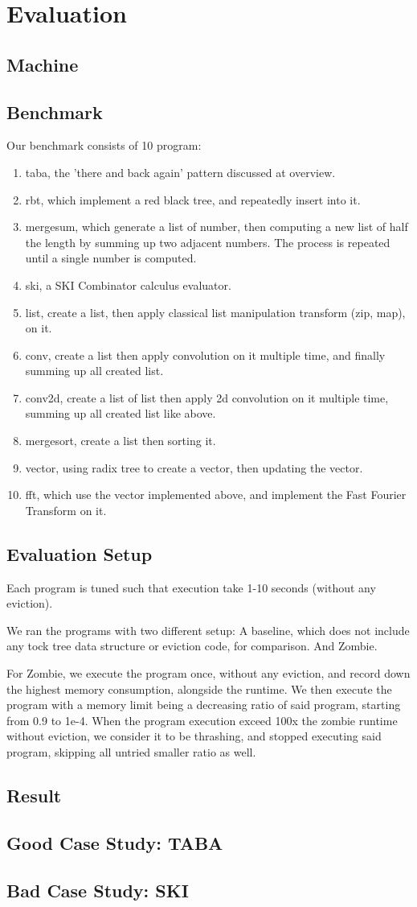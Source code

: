 \section{Evaluation}
\subsection{Machine}
\subsection{Benchmark}
Our benchmark consists of 10 program:
\begin{enumerate}
	\item taba, the 'there and back again' pattern discussed at overview.
	\item rbt, which implement a red black tree, and repeatedly insert into it.
	\item mergesum, which generate a list of number, then computing a new list of half the length by summing up two adjacent numbers. The process is repeated until a single number is computed.
	\item ski, a SKI Combinator calculus evaluator.
	\item list, create a list, then apply classical list manipulation transform (zip, map), on it.
	\item conv, create a list then apply convolution on it multiple time, and finally summing up all created list.
	\item conv2d, create a list of list then apply 2d convolution on it multiple time, summing up all created list like above.
	\item mergesort, create a list then sorting it.
	\item vector, using radix tree to create a vector, then updating the vector.
	\item fft, which use the vector implemented above, and implement the Fast Fourier Transform on it.
\end{enumerate}
\subsection{Evaluation Setup}
Each program is tuned such that execution take 1-10 seconds (without any eviction).

We ran the programs with two different setup:
A baseline, which does not include any tock tree data structure or eviction code, for comparison.
And Zombie.

For Zombie, we execute the program once, without any eviction, and record down the highest memory consumption, alongside the runtime.
We then execute the program with a memory limit being a decreasing ratio of said program, starting from 0.9 to 1e-4.
When the program execution exceed 100x the zombie runtime without eviction, we consider it to be thrashing, and stopped executing said program, skipping all untried smaller ratio as well.

\subsection{Result}
\subsection{Good Case Study: TABA}
\subsection{Bad Case Study: SKI}